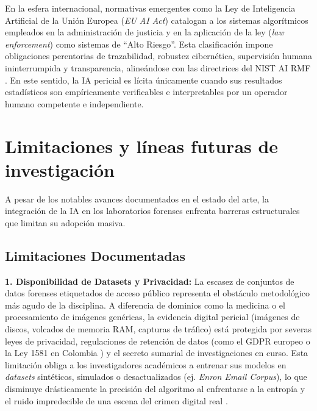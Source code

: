 \documentclass[journal]{IEEEtran}
\begin{document}
En la esfera internacional, normativas emergentes como la Ley de Inteligencia Artificial de la Unión Europea (\textit{EU AI Act}) \cite{EU_AI_Act_2024} catalogan a los sistemas algorítmicos empleados en la administración de justicia y en la aplicación de la ley (\textit{law enforcement}) como sistemas de ``Alto Riesgo''. Esta clasificación impone obligaciones perentorias de trazabilidad, robustez cibernética, supervisión humana ininterrumpida y transparencia, alineándose con las directrices del NIST AI RMF \cite{NIST_AI_RMF_2023}. En este sentido, la IA pericial es lícita únicamente cuando sus resultados estadísticos son empíricamente verificables e interpretables por un operador humano competente e independiente.

\section{Limitaciones y líneas futuras de investigación}
\label{sec:futuro}
A pesar de los notables avances documentados en el estado del arte, la integración de la IA en los laboratorios forenses enfrenta barreras estructurales que limitan su adopción masiva.

\subsection{Limitaciones Documentadas}
\textbf{1. Disponibilidad de Datasets y Privacidad:} La escasez de conjuntos de datos forenses etiquetados de acceso público representa el obstáculo metodológico más agudo de la disciplina. A diferencia de dominios como la medicina o el procesamiento de imágenes genéricas, la evidencia digital pericial (imágenes de discos, volcados de memoria RAM, capturas de tráfico) está protegida por severas leyes de privacidad, regulaciones de retención de datos (como el GDPR europeo o la Ley 1581 en Colombia \cite{Ley1581_2012}) y el secreto sumarial de investigaciones en curso. Esta limitación obliga a los investigadores académicos a entrenar sus modelos en \textit{datasets} sintéticos, simulados o desactualizados (ej. \textit{Enron Email Corpus}), lo que disminuye drásticamente la precisión del algoritmo al enfrentarse a la entropía y el ruido impredecible de una escena del crimen digital real \cite{QuickDarren2014Ioiv}.
\end{document}
